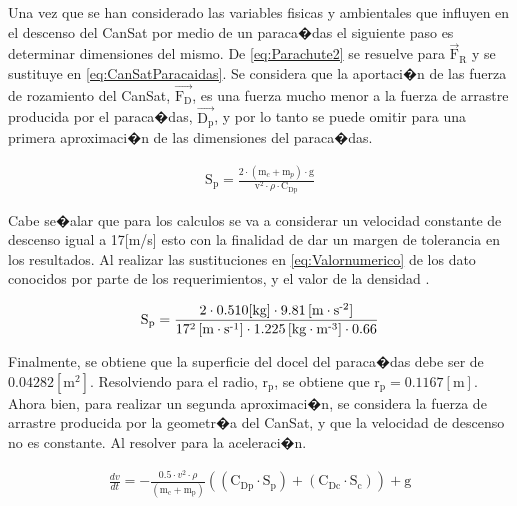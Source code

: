 \documentclass[10pt,a4paper]{book}
\begin{document}
Una vez que se han considerado las variables fisicas y ambientales que influyen en el descenso del CanSat por medio de un paraca�das el siguiente paso es determinar dimensiones del mismo. De \eqref{eq:Parachute2} se resuelve para $\overrightarrow{\text{F}}_{\text{R}}$ y se sustituye en \eqref{eq:CanSatParacaidas}. Se considera que la aportaci�n de las fuerza de rozamiento del CanSat, $\overrightarrow{\text{F}_{\text{D}}}$, es una fuerza mucho menor a la fuerza de arrastre producida por el paraca�das, $\overrightarrow{\text{D}_{\text{p}}}$, y por lo tanto se puede omitir para una primera aproximaci�n de las dimensiones del paraca�das.

\begin{align}
\label{eq:Valornumerico}
\text{S}_{\text{p}} = \frac{2 \cdot \left( \text{m}_{c} + \text{m}_{p} \right) \cdot \text{g}}{\text{v}^{2} \cdot \rho  \cdot \text{C}_{\text{Dp}}} 
\end{align}

Cabe se�alar que para los calculos se va a considerar un velocidad constante de descenso igual a 17[m/s] esto con la finalidad de dar un margen de tolerancia en los resultados. Al realizar las sustituciones en \eqref{eq:Valornumerico} de los dato conocidos por parte de los requerimientos, y el valor de la densidad \cite{Densidad}.

\begin{align}
\notag
\text{S}_{\text{p}} = \frac{2 \cdot 0{.}510 \text{[kg]} \cdot 9{.}81 \left[ \text{m} \cdot \text{s}^{\text{-2}} \right]} {17^{2} \left[ \text{m} \cdot \text{s}^{\text{-1}}\right] \cdot 1{.}225 \left[ \text{kg} \cdot \text{m}^{\text{-3}} \right] \cdot 0{.}66 }
\end{align} 

Finalmente, se obtiene que la superficie del docel del  paraca�das debe ser de $0{.}04282 \left[ \text{m}^{\text{2}} \right]$. Resolviendo para el radio, $\text{r}_{\text{p}}$, se obtiene que $\text{r}_{\text{p}} = 0{.}1167 \left[\text{m}\right]$. \\

Ahora bien, para realizar un segunda aproximaci�n, se considera la fuerza de arrastre producida por la geometr�a del CanSat, y que la velocidad de descenso no es constante. Al resolver para la aceleraci�n.

\begin{align}
\label{eq:EcuPara}
\frac{dv}{dt} = - \frac{0{.}5 \cdot  v^{2} \cdot \rho}{(\text{m}_{\text{c}} + \text{m}_{\text{p}})}\left(( \text{C}_{\text{Dp}} \cdot \text{S}_{\text{p}})  + (\text{C}_{\text{Dc}} \cdot \text{S}_{\text{c}}) \right) + \text{g} 
\end{align}
\end{document}

